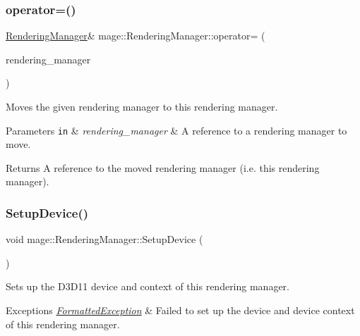 \subsubsection{\texorpdfstring{operator=()}{operator=()}\hspace{0.1cm}{\footnotesize\ttfamily [2/2]}}
{\footnotesize\ttfamily \hyperlink{classmage_1_1_rendering_manager}{Rendering\+Manager}\& mage\+::\+Rendering\+Manager\+::operator= (\begin{DoxyParamCaption}\item[{\hyperlink{classmage_1_1_rendering_manager}{Rendering\+Manager} \&\&}]{rendering\+\_\+manager }\end{DoxyParamCaption})\hspace{0.3cm}{\ttfamily [delete]}}

Moves the given rendering manager to this rendering manager.


\begin{DoxyParams}[1]{Parameters}
\mbox{\tt in}  & {\em rendering\+\_\+manager} & A reference to a rendering manager to move. \\
\hline
\end{DoxyParams}
\begin{DoxyReturn}{Returns}
A reference to the moved rendering manager (i.\+e. this rendering manager). 
\end{DoxyReturn}
\hypertarget{classmage_1_1_rendering_manager_a45d4cadcd572290f352027b5fa86b4f6}{}\label{classmage_1_1_rendering_manager_a45d4cadcd572290f352027b5fa86b4f6} 
\subsubsection{\texorpdfstring{Setup\+Device()}{SetupDevice()}}
{\footnotesize\ttfamily void mage\+::\+Rendering\+Manager\+::\+Setup\+Device (\begin{DoxyParamCaption}{ }\end{DoxyParamCaption})\hspace{0.3cm}{\ttfamily [private]}}

Sets up the D3\+D11 device and context of this rendering manager.


\begin{DoxyExceptions}{Exceptions}
{\em \hyperlink{structmage_1_1_formatted_exception}{Formatted\+Exception}} & Failed to set up the device and device context of this rendering manager. \\
\hline
\end{DoxyExceptions}
\hypertarget{classmage_1_1_rendering_manager_a3665d58d2a9e8995a348b5f2bd723d8b}{}\label{classmage_1_1_rendering_manager_a3665d58d2a9e8995a348b5f2bd723d8b} 
